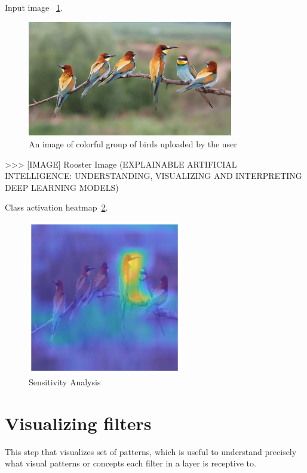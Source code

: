 Input image ~\ref{fig:myFig}.
\begin{figure}[htbp]
\centering
\includegraphics[width=0.80\textwidth]{images/colorful-group-of-birds-get-together_vkmuak6_e__F0000.png}
\caption{An image of colorful group of birds uploaded by the user}
\label{fig:myFig}
\end{figure}

>>> [IMAGE] Rooster Image (EXPLAINABLE ARTIFICIAL INTELLIGENCE: UNDERSTANDING, VISUALIZING AND INTERPRETING DEEP LEARNING MODELS)

Class activation heatmap~\ref{fig:heatmap-1}.
\begin{figure}[htbp]
\centering
\includegraphics[width=0.60\textwidth]{images/heatmap-class-activations.png}
\caption{Sensitivity Analysis}
\label{fig:heatmap-1}
\end{figure}

\section*{Visualizing filters}

This step that visualizes set of patterns, which is useful to understand precisely what visual patterns or concepts each filter in a layer is receptive to.

